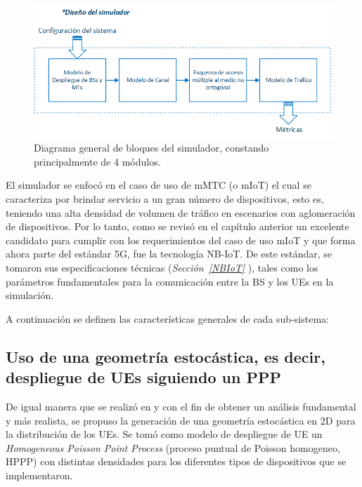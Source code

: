 \begin{figure}[th]
    \centering
    \includegraphics[scale=.9]{Figures/Diagrama general de bloques del simulador}
    \decoRule
    \caption[Diagrama general de bloques del simulador, constando principalmente de 4 módulos.]{Diagrama general de bloques del simulador, constando principalmente de 4 módulos.}
    \label{fig:DiagramaGral}
\end{figure}

El simulador se enfocó en el caso de uso de mMTC (o mIoT) el cual se caracteriza por brindar servicio a un gran número de dispositivos, esto es, teniendo una alta densidad de volumen de tráfico en escenarios con aglomeración de dispositivos. Por lo tanto, como se revisó en el capítulo anterior un excelente candidato para cumplir con los requerimientos del caso de uso mIoT y que forma ahora parte del estándar 5G, fue la tecnología NB-IoT. De este estándar, se tomaron sus especificaciones técnicas (\textit{Sección~\ref{NBIoT} }), tales como los parámetros fundamentales para la comunicación entre la BS y los UEs en la simulación.\newline

A continuación se definen las características generales de cada sub-sistema:

\subsection{Uso de una geometría estocástica, es decir, despliegue de UEs siguiendo un PPP}

De igual manera que se realizó en \parencite{Kouzayha2018} y \parencite{Zhang2017} con el fin de obtener un análisis fundamental y más realista, se propuso la generación de una geometría estocástica en 2D para la distribución de los UEs. Se tomó como modelo de despliegue de UE un \textit{ Homogeneous Poisson Point Process }(proceso puntual de Poisson homogeneo, HPPP) con distintas densidades para los diferentes tipos de dispositivos que se implementaron.\newline

